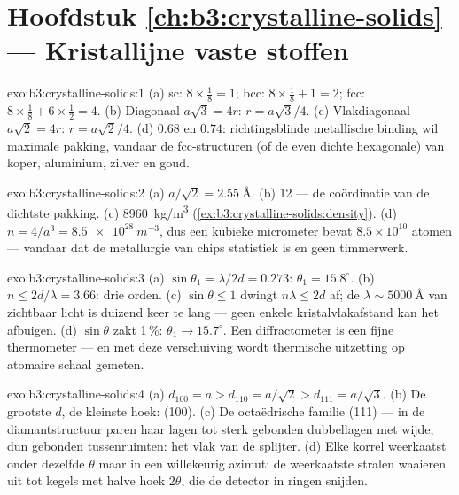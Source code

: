 \section*{Hoofdstuk \ref{ch:b3:crystalline-solids} --- Kristallijne vaste stoffen}

\begin{solution}{exo:b3:crystalline-solids:1}
(a) sc: $8\times\tfrac18 = 1$; bcc: $8\times\tfrac18 + 1 = 2$;
fcc: $8\times\tfrac18 + 6\times\tfrac12 = 4$. (b) Diagonaal
$a\sqrt3 = 4r$: $r = a\sqrt3/4$. (c) Vlakdiagonaal $a\sqrt2 = 4r$:
$r = a\sqrt2/4$. (d) $0.68$ en $0.74$: richtingsblinde metallische
binding wil maximale pakking, vandaar de fcc-structuren (of de even dichte
hexagonale) van koper, aluminium, zilver en goud.
\end{solution}

\begin{solution}{exo:b3:crystalline-solids:2}
(a) $a/\sqrt2 = \qty{2.55}{\angstrom}$. (b) 12 --- de
coördinatie van de dichtste pakking. (c) \qty{8960}{kg/m^3}
(\cref{ex:b3:crystalline-solids:density}). (d) $n = 4/a^3 =
\qty{8.5e28}{m^{-3}}$, dus een kubieke micrometer bevat
$8.5\times10^{10}$ atomen --- vandaar dat de metallurgie van chips
statistiek is en geen timmerwerk.
\end{solution}

\begin{solution}{exo:b3:crystalline-solids:3}
(a) $\sin\theta_1 = \lambda/2d = 0.273$: $\theta_1 =
15.8^\circ$. (b) $n \le 2d/\lambda = 3.66$: drie orden. (c)
$\sin\theta \le 1$ dwingt $n\lambda \le 2d$ af; de
$\lambda \sim \qty{5000}{\angstrom}$ van zichtbaar licht is duizend keer te lang
--- geen enkele kristalvlakafstand kan het afbuigen. (d) $\sin\theta$
zakt 1\,\%: $\theta_1 \to 15.7^\circ$. Een diffractometer is een fijne
thermometer --- en met deze verschuiving wordt thermische uitzetting
op atomaire schaal gemeten.
\end{solution}

\begin{solution}{exo:b3:crystalline-solids:4}
(a) $d_{100} = a > d_{110} = a/\sqrt2 > d_{111} = a/\sqrt3$. (b)
De grootste $d$, de kleinste hoek: (100). (c) De octaëdrische
familie (111) --- in de diamantstructuur paren haar lagen tot sterk
gebonden dubbellagen met wijde, dun gebonden tussenruimten:
het vlak van de splijter. (d) Elke korrel weerkaatst onder dezelfde $\theta$
maar in een willekeurig azimut: de weerkaatste stralen waaieren uit tot kegels met
halve hoek $2\theta$, die de detector in ringen snijden.
\end{solution}

